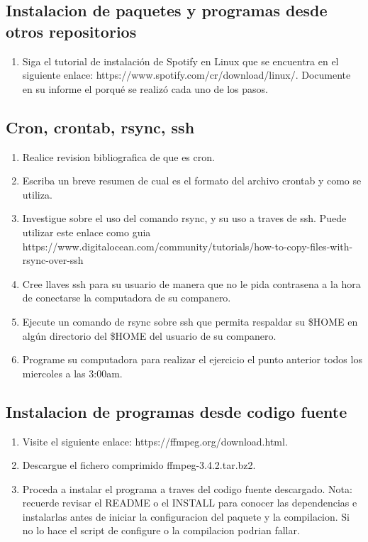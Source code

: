 \documentclass[11pt]{article}
\begin{document}
\subsection{Instalacion de paquetes y programas desde otros repositorios}
\begin{enumerate}
\item Siga el tutorial de instalación de Spotify en Linux que se encuentra en el siguiente enlace:
https://www.spotify.com/cr/download/linux/. Documente en su informe el porqué se
realizó cada uno de los pasos.

\end{enumerate}

\subsection{Cron, crontab, rsync, ssh}
\begin{enumerate}
\item Realice revision bibliografica de que es cron.
\item Escriba un breve resumen de cual es el formato del archivo crontab y como se utiliza.
\item Investigue sobre el uso del comando rsync, y su uso a traves de ssh. Puede utilizar este enlace como guia https://www.digitalocean.com/community/tutorials/how-to-copy-files-with-rsync-over-ssh
\item Cree llaves ssh para su usuario de manera que no le pida contrasena a la hora de conectarse la computadora de su companero.
\item Ejecute un comando de rsync sobre ssh que permita respaldar su \$HOME en algún directorio del \$HOME del usuario de su companero.
\item Programe su computadora para realizar el ejercicio el punto anterior todos los miercoles a las 3:00am.

\end{enumerate}

\subsection{Instalacion de programas desde codigo fuente}
\begin{enumerate}
\item Visite el siguiente enlace: https://ffmpeg.org/download.html.
\item Descargue el fichero comprimido ffmpeg-3.4.2.tar.bz2.
\item Proceda a instalar el programa a traves del codigo fuente descargado.
Nota: recuerde revisar el README o el INSTALL para conocer las dependencias e instalarlas antes de iniciar la configuracion del paquete y la compilacion. Si no lo hace el script de configure o la compilacion podrian fallar.
\end{enumerate}
\end{document}
